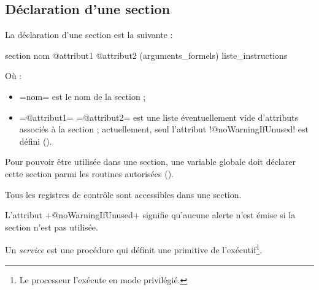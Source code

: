 \subsection{Déclaration d'une section}


La déclaration d'une section est la suivante :
\begin{PLM}
section nom @attribut1 @attribut2 (arguments_formels) {
  liste_instructions
}
\end{PLM}
Où :
\begin{itemize}
  \item \plm=nom= est le nom de la section ;
  \item \plm=@attribut1= \plm=@attribut2= est une liste éventuellement vide d'attributs associés à la section ; actuellement, seul l'attribut \plm!@noWarningIfUnused! est défini ().
\end{itemize}




Pour pouvoir être utilisée dans une section, une variable globale doit déclarer cette section parmi les routines autorisées ().




Tous les registres de contrôle sont accessibles dans une section.








L'attribut \plm+@noWarningIfUnused+ signifie qu'aucune alerte n'est émise si la section n'est pas utilisée.




















Un \emph{service} est une procédure qui définit une primitive de l'exécutif\footnote{Le processeur l'exécute en mode privilégié.}.

